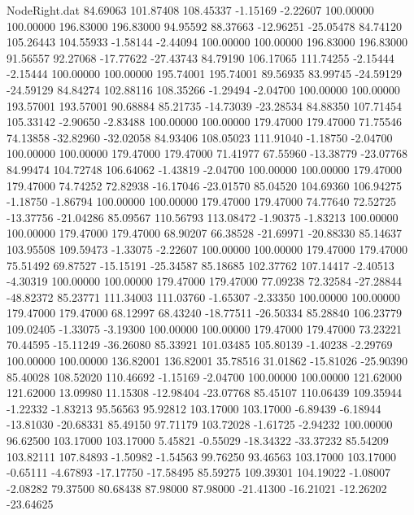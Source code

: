 \begin{filecontents}{NodeRight.dat}
  84.69063  101.87408  108.45337    -1.15169   -2.22607  100.00000  100.00000  196.83000  196.83000   94.95592   88.37663  -12.96251  -25.05478
  84.74120  105.26443  104.55933    -1.58144   -2.44094  100.00000  100.00000  196.83000  196.83000   91.56557   92.27068  -17.77622  -27.43743
  84.79190  106.17065  111.74255    -2.15444   -2.15444  100.00000  100.00000  195.74001  195.74001   89.56935   83.99745  -24.59129  -24.59129
  84.84274  102.88116  108.35266    -1.29494   -2.04700  100.00000  100.00000  193.57001  193.57001   90.68884   85.21735  -14.73039  -23.28534
  84.88350  107.71454  105.33142    -2.90650   -2.83488  100.00000  100.00000  179.47000  179.47000   71.75546   74.13858  -32.82960  -32.02058
  84.93406  108.05023  111.91040    -1.18750   -2.04700  100.00000  100.00000  179.47000  179.47000   71.41977   67.55960  -13.38779  -23.07768
  84.99474  104.72748  106.64062    -1.43819   -2.04700  100.00000  100.00000  179.47000  179.47000   74.74252   72.82938  -16.17046  -23.01570
  85.04520  104.69360  106.94275    -1.18750   -1.86794  100.00000  100.00000  179.47000  179.47000   74.77640   72.52725  -13.37756  -21.04286
  85.09567  110.56793  113.08472    -1.90375   -1.83213  100.00000  100.00000  179.47000  179.47000   68.90207   66.38528  -21.69971  -20.88330
  85.14637  103.95508  109.59473    -1.33075   -2.22607  100.00000  100.00000  179.47000  179.47000   75.51492   69.87527  -15.15191  -25.34587
  85.18685  102.37762  107.14417    -2.40513   -4.30319  100.00000  100.00000  179.47000  179.47000   77.09238   72.32584  -27.28844  -48.82372
  85.23771  111.34003  111.03760    -1.65307   -2.33350  100.00000  100.00000  179.47000  179.47000   68.12997   68.43240  -18.77511  -26.50334
  85.28840  106.23779  109.02405    -1.33075   -3.19300  100.00000  100.00000  179.47000  179.47000   73.23221   70.44595  -15.11249  -36.26080
  85.33921  101.03485  105.80139    -1.40238   -2.29769  100.00000  100.00000  136.82001  136.82001   35.78516   31.01862  -15.81026  -25.90390
  85.40028  108.52020  110.46692    -1.15169   -2.04700  100.00000  100.00000  121.62000  121.62000   13.09980   11.15308  -12.98404  -23.07768
  85.45107  110.06439  109.35944    -1.22332   -1.83213   95.56563   95.92812  103.17000  103.17000   -6.89439   -6.18944  -13.81030  -20.68331
  85.49150   97.71179  103.72028    -1.61725   -2.94232  100.00000   96.62500  103.17000  103.17000    5.45821   -0.55029  -18.34322  -33.37232
  85.54209  103.82111  107.84893    -1.50982   -1.54563   99.76250   93.46563  103.17000  103.17000   -0.65111   -4.67893  -17.17750  -17.58495
  85.59275  109.39301  104.19022    -1.08007   -2.08282   79.37500   80.68438   87.98000   87.98000  -21.41300  -16.21021  -12.26202  -23.64625

\end{filecontents}
